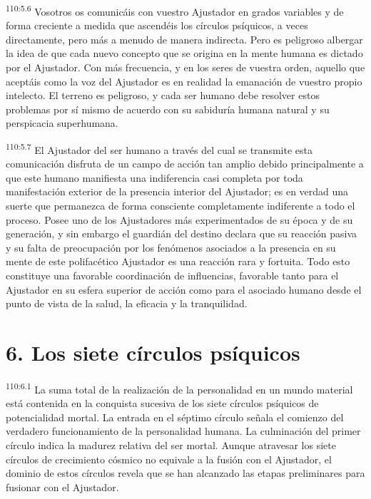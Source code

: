 \par
\textsuperscript{110:5.6} Vosotros os comunicáis con vuestro Ajustador en grados variables y de forma creciente a medida que ascendéis los círculos psíquicos, a veces directamente, pero más a menudo de manera indirecta. Pero es peligroso albergar la idea de que cada nuevo concepto que se origina en la mente humana es dictado por el Ajustador. Con más frecuencia, y en los seres de vuestra orden, aquello que aceptáis como la voz del Ajustador es en realidad la emanación de vuestro propio intelecto. El terreno es peligroso, y cada ser humano debe resolver estos problemas por sí mismo de acuerdo con su sabiduría humana natural y su perspicacia superhumana.

\par
\textsuperscript{110:5.7} El Ajustador del ser humano a través del cual se transmite esta comunicación disfruta de un campo de acción tan amplio debido principalmente a que este humano manifiesta una indiferencia casi completa por toda manifestación exterior de la presencia interior del Ajustador; es en verdad una suerte que permanezca de forma consciente completamente indiferente a todo el proceso. Posee uno de los Ajustadores más experimentados de su época y de su generación, y sin embargo el guardián del destino declara que su reacción pasiva y su falta de preocupación por los fenómenos asociados a la presencia en su mente de este polifacético Ajustador es una reacción rara y fortuita. Todo esto constituye una favorable coordinación de influencias, favorable tanto para el Ajustador en su esfera superior de acción como para el asociado humano desde el punto de vista de la salud, la eficacia y la tranquilidad.

\section*{6. Los siete círculos psíquicos}
\par
\textsuperscript{110:6.1} La suma total de la realización de la personalidad en un mundo material está contenida en la conquista sucesiva de los siete círculos psíquicos de potencialidad mortal. La entrada en el séptimo círculo señala el comienzo del verdadero funcionamiento de la personalidad humana. La culminación del primer círculo indica la madurez relativa del ser mortal. Aunque atravesar los siete círculos de crecimiento cósmico no equivale a la fusión con el Ajustador, el dominio de estos círculos revela que se han alcanzado las etapas preliminares para fusionar con el Ajustador.

